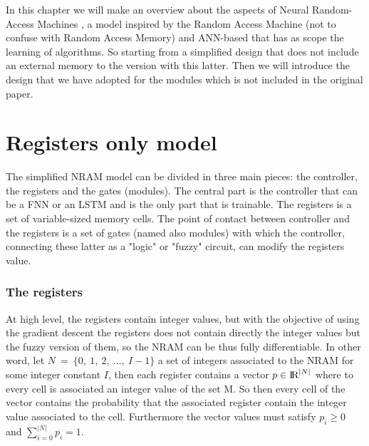 In this chapter we will make an overview about the aspects of Neural Random-Access Machines \cite{NRAM:2015}, a model inspired by the Random Access Machine (not to confuse with Random Access Memory) and ANN-based that has as scope the learning of algorithms. So starting from a simplified design that does not include an external memory to the version with this latter. Then we will introduce the design that we have adopted for the modules which is not included in the original paper. 


\section{Registers only model}
The simplified NRAM model can be divided in three main pieces: the controller, the registers and the gates (modules). The central part is the controller that can be a FNN or an LSTM and is the only part that is trainable. The registers is a set of variable-sized memory cells. The point of contact between controller and the registers is a set of gates (named also modules) with which the controller, connecting these latter as a "logic" or "fuzzy" circuit, can modify the registers value. 

\subsubsection*{The registers}
At high level, the registers contain integer values, but with the objective of using the gradient descent the registers does not contain directly the integer values but the fuzzy version of them, so the NRAM can be thus fully differentiable. In other word, let $N\ =\ \{0,\ 1,\ 2,\ \dots,\ I - 1\}$ a set of integers associated to the NRAM for some integer constant $I$, then each register contains a vector $p \in \textrm{I\!R}^{|N|}$ where to every cell is associated an integer value of the set M. So then every cell of the vector contains the probability that the associated register contain the integer value associated to the cell. Furthermore the vector values must satisfy $p_{i} \geq 0$ and $\sum\limits_{i = 0}^{|N|} p_{i} = 1$.

